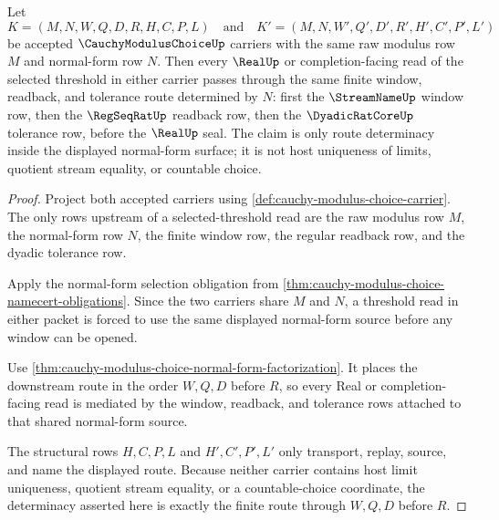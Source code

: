 \begin{theorem}
\label{thm:cauchy-modulus-choice-window-determinacy}
Let
$$
K=(M,N,W,Q,D,R,H,C,P,L)
\quad\text{and}\quad
K'=(M,N,W',Q',D',R',H',C',P',L')
$$
be accepted $\CauchyModulusChoiceUp$ carriers with the same raw modulus row $M$ and normal-form row $N$. Then every $\RealUp$ or completion-facing read of the selected threshold in either carrier passes through the same finite window, readback, and tolerance route determined by $N$: first the $\StreamNameUp$ window row, then the $\RegSeqRatUp$ readback row, then the $\DyadicRatCoreUp$ tolerance row, before the $\RealUp$ seal. The claim is only route determinacy inside the displayed normal-form surface; it is not host uniqueness of limits, quotient stream equality, or countable choice.
\end{theorem}
\begin{proof}
Project both accepted carriers using \autoref{def:cauchy-modulus-choice-carrier}. The only rows upstream of a selected-threshold read are the raw modulus row $M$, the normal-form row $N$, the finite window row, the regular readback row, and the dyadic tolerance row.

Apply the normal-form selection obligation from \autoref{thm:cauchy-modulus-choice-namecert-obligations}. Since the two carriers share $M$ and $N$, a threshold read in either packet is forced to use the same displayed normal-form source before any window can be opened.

Use \autoref{thm:cauchy-modulus-choice-normal-form-factorization}. It places the downstream route in the order $W,Q,D$ before $R$, so every Real or completion-facing read is mediated by the window, readback, and tolerance rows attached to that shared normal-form source.

The structural rows $H,C,P,L$ and $H',C',P',L'$ only transport, replay, source, and name the displayed route. Because neither carrier contains host limit uniqueness, quotient stream equality, or a countable-choice coordinate, the determinacy asserted here is exactly the finite route through $W,Q,D$ before $R$.
\end{proof}

